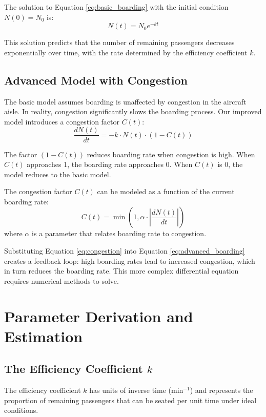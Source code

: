 \documentclass[12pt,a4paper]{article}
\begin{document}
The solution to Equation \ref{eq:basic_boarding} with the initial condition $N(0) = N_0$ is:
\begin{equation}
N(t) = N_0 e^{-kt}
\label{eq:basic_solution}
\end{equation}

This solution predicts that the number of remaining passengers decreases exponentially over time, with the rate determined by the efficiency coefficient $k$.

\subsection{Advanced Model with Congestion}
The basic model assumes boarding is unaffected by congestion in the aircraft aisle. In reality, congestion significantly slows the boarding process. Our improved model introduces a congestion factor $C(t)$:
\begin{equation}
\frac{dN(t)}{dt} = -k \cdot N(t) \cdot (1 - C(t))
\label{eq:advanced_boarding}
\end{equation}

The factor $(1 - C(t))$ reduces boarding rate when congestion is high. When $C(t)$ approaches 1, the boarding rate approaches 0. When $C(t)$ is 0, the model reduces to the basic model.

The congestion factor $C(t)$ can be modeled as a function of the current boarding rate:
\begin{equation}
C(t) = \min\left(1, \alpha \cdot \left| \frac{dN(t)}{dt} \right| \right)
\label{eq:congestion}
\end{equation}
where $\alpha$ is a parameter that relates boarding rate to congestion.

Substituting Equation \ref{eq:congestion} into Equation \ref{eq:advanced_boarding} creates a feedback loop: high boarding rates lead to increased congestion, which in turn reduces the boarding rate. This more complex differential equation requires numerical methods to solve.

\section{Parameter Derivation and Estimation}

\subsection{The Efficiency Coefficient $k$}
The efficiency coefficient $k$ has units of inverse time (min$^{-1}$) and represents the proportion of remaining passengers that can be seated per unit time under ideal conditions.
\end{document}

